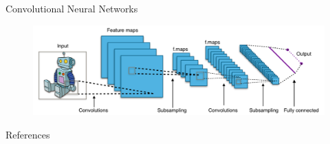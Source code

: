\documentclass[18pt]{beamer}
\begin{document}
\begin{frame}{Convolutional Neural Networks}
    \begin{figure}[h]
        \centering
        \includegraphics[width=1\textwidth]{Typical_cnn.png}
        \end{figure}
\end{frame}

\appendix
\beginbackup

\begin{frame}[allowframebreaks]{References}

\printbibliography
\end{frame}

\backupend
\end{document}
